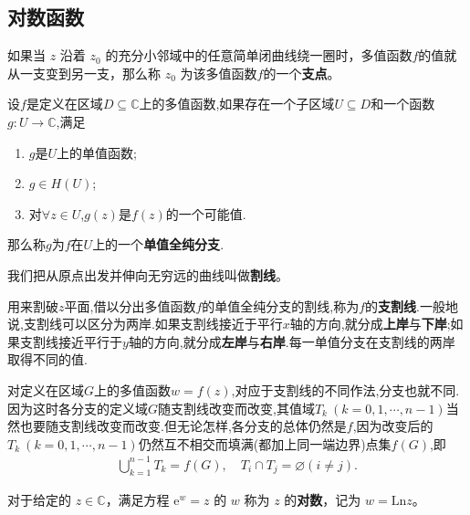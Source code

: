 \documentclass[../../main.tex]{subfiles}%
\begin{document}
\subsection{对数函数}

\begin{definition}[支点]
如果当 \( z \) 沿着 \( z_0 \) 的充分小邻域中的任意简单闭曲线绕一圈时，多值函数$f$的值就从一支变到另一支，那么称 \( z_0 \) 为该多值函数$f$的一个\textbf{支点}。
\end{definition}

\begin{definition}
设$f$是定义在区域$D\subseteq \mathbb{C}$上的多值函数,如果存在一个子区域$U\subseteq D$和一个函数$g:U\rightarrow \mathbb{C}$,满足
\begin{enumerate}[(1)]
\item $g$是$U$上的单值函数;
\item $g\in H\left( U \right)$;
\item 对$\forall z\in U$,$g\left( z \right)$是$f\left( z \right)$的一个可能值.
\end{enumerate}
那么称$g$为$f$在$U$上的一个\textbf{单值全纯分支}.
\end{definition}

\begin{definition}
我们把从原点出发并伸向无穷远的曲线叫做\textbf{割线}。

用来割破$z$平面,借以分出多值函数$f$的单值全纯分支的割线,称为$f$的\textbf{支割线}.一般地说,支割线可以区分为两岸.如果支割线接近于平行$x$轴的方向,就分成\textbf{上岸}与\textbf{下岸};如果支割线接近平行于$y$轴的方向,就分成\textbf{左岸}与\textbf{右岸}.每一单值分支在支割线的两岸取得不同的值.
\end{definition}
\begin{remark}
对定义在区域$G$上的多值函数$w=f(z)$,对应于支割线的不同作法,分支也就不同.因为这时各分支的定义域$G$随支割线改变而改变,其值域$T_{k}\ (k=0,1,\cdots,n-1)$当然也要随支割线改变而改变.但无论怎样,各分支的总体仍然是$f$,因为改变后的$T_{k}\ (k=0,1,\cdots,n-1)$仍然互不相交而填满(都加上同一端边界)点集$f(G)$,即
\begin{align*}
\bigcup_{k=1}^{n-1}{T_k}=f(G),\quad T_i\cap T_j=\varnothing \left( i\ne j \right) .
\end{align*}
\end{remark}

\begin{definition}
对于给定的 \( z \in \mathbb{C} \)，满足方程 \( \mathrm{e}^w = z \) 的 \( w \) 称为 \( z \) 的\textbf{对数}，记为 \( w = \mathrm{Ln} z \)。
\end{definition}
\end{document}
